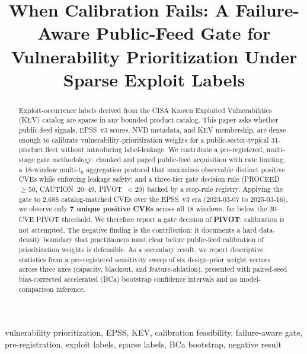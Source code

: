 \documentclass[conference]{IEEEtran}
\begin{document}
\title{When Calibration Fails: A Failure-Aware Public-Feed Gate for
Vulnerability Prioritization Under Sparse Exploit Labels}

\author{%
}

\maketitle

\begin{abstract}
Exploit-occurrence labels derived from the CISA Known Exploited
Vulnerabilities (KEV) catalog are sparse in any bounded product catalog.
This paper asks whether public-feed signals, EPSS~v3 scores, NVD
metadata, and KEV membership, are dense enough to calibrate
vulnerability-prioritization weights for a public-sector-typical 31-product
fleet without introducing label-leakage. We contribute a pre-registered,
multi-stage gate methodology: chunked and paged public-feed acquisition with
rate limiting; a 18-window multi-\(t_0\) aggregation protocol that maximizes
observable distinct positive CVEs while enforcing leakage safety; and a
three-tier gate decision rule (PROCEED~$\geq 50$, CAUTION~20--49,
PIVOT~$<20$) backed by a stop-rule registry. Applying the gate to
2,688 catalog-matched CVEs over the EPSS~v3 era (2023-03-07 to
2025-03-16), we observe only \textbf{7 unique positive CVEs} across all
18 windows, far below the 20-CVE PIVOT threshold. We therefore report a
gate decision of \textbf{PIVOT}: calibration is not attempted. The negative
finding is the contribution: it documents a hard data-density boundary that
practitioners must clear before public-feed calibration of prioritization
weights is defensible. As a secondary result, we report descriptive
statistics from a pre-registered sensitivity sweep of six design-prior weight
vectors across three axes (capacity, blackout, and feature-ablation),
presented with paired-seed bias-corrected accelerated (BCa) bootstrap
confidence intervals and no model-comparison inference.
\end{abstract}

\begin{IEEEkeywords}
vulnerability prioritization, EPSS, KEV, calibration feasibility,
failure-aware gate, pre-registration, exploit labels, sparse labels,
BCa bootstrap, negative result
\end{IEEEkeywords}
\end{document}
